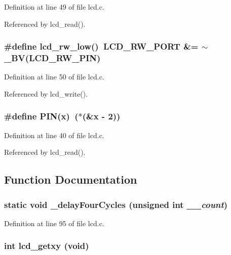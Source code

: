 Definition at line 49 of file lcd.c.

Referenced by lcd\_\-read().
\subsubsection{\setlength{\rightskip}{0pt plus 5cm}\#define lcd\_\-rw\_\-low()~LCD\_\-RW\_\-PORT \&= $\sim$\_\-BV(LCD\_\-RW\_\-PIN)}\label{lcd_8c_7f5ebe0ca71b1298a7d3423850cc82b1}




Definition at line 50 of file lcd.c.

Referenced by lcd\_\-write().
\subsubsection{\setlength{\rightskip}{0pt plus 5cm}\#define PIN(x)~($\ast$(\&x - 2))}\label{lcd_8c_d7581da21e9fd6fd6f6920dd68d1c782}




Definition at line 40 of file lcd.c.

Referenced by lcd\_\-read().

\subsection{Function Documentation}
\subsubsection{\setlength{\rightskip}{0pt plus 5cm}static void \_\-delayFourCycles (unsigned int {\em \_\-\_\-count})\hspace{0.3cm}{\tt  [inline, static]}}\label{lcd_8c_efcdb888ba5cb63b7ba5c1a74f7738be}




Definition at line 95 of file lcd.c.
\subsubsection{\setlength{\rightskip}{0pt plus 5cm}int lcd\_\-getxy (void)}\label{lcd_8c_db21ec2be5713b0540c4c273c33dfd7f}




